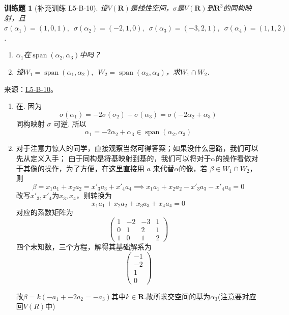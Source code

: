 \documentclass[UTF8,12pt,a4paper,fontset=fandol]{ctexart}
\newtheorem{exercise}{训练题}[section]
\begin{document}
\begin{exercise}[补充训练 L5-B-10]\label{prob:L5-B-10}
设$V(\mathbf{R})$是线性空间，$\sigma$是$V(\mathbf{R})$到$\mathbf{R}^3$的同构映射，且$\sigma(\alpha_1)=(1,0,1),\enspace\allowbreak\sigma(\alpha_2)=(-2,1,0),\enspace\allowbreak\sigma(\alpha_3)=(-3,2,1),\enspace\allowbreak\sigma(\alpha_4)=(1,1,2)$.
        \begin{enumerate}
            \item $\alpha_1$在$\operatorname{span}(\alpha_2,\alpha_3)$中吗？

            \item 设$W_1=\operatorname{span}(\alpha_1,\alpha_2),\enspace W_2=\operatorname{span}(\alpha_3,\alpha_4)$，求$W_1\cap W_2$.
        \end{enumerate}
\end{exercise}
\noindent 来源：\href{https://github.com/yhwu-is/Linear-Algebra-Left-Undone/blob/new/%E8%AE%B2%E4%B9%89/%E4%B8%93%E9%A2%98/5%20%E7%BA%BF%E6%80%A7%E6%98%A0%E5%B0%84.tex}{L5-B-10}。
\begin{solve}
\begin{enumerate}
                \item 在. 因为
                      \[ \sigma(\alpha_1) = -2 \sigma(\sigma_2) + \sigma(\alpha_3) = \sigma(-2 \alpha_2 + \alpha_3) \]
                      同构映射 $ \sigma $ 可逆. 所以
                      \[ \alpha_1 = -2 \alpha_2 + \alpha_3 \in \operatorname{span}(\alpha_2, \alpha_3) \]
                \item 对于注意力惊人的同学，直接观察当然可得答案；如果没什么思路，我们可以先从定义入手；
                由于同构是将基映射到基的，我们可以将对于$\alpha$的操作看做对于其像的操作，为了方便，在这里直接用 $a$ 来代替$\alpha$的像，若 $\beta \in W_1\cap W_2$，则
                \[ \beta = x_1 a_1+x_2 a_2=x'_3 a_3+x'_4 a_4 \implies  x_1 a_1+x_2 a_2-x'_3 a_3-x'_4 a_4 = 0 \]
                改写$x'_3,x'_4$为$x_3,x_4$，则转换为
                \[ x_1 a_1+x_2 a_2+x_3 a_3+x_4 a_4 = 0 \]
                对应的系数矩阵为
                \[ \begin{pmatrix}
                    1 & -2 & -3 & 1 \\
                    0 & 1 & 2 & 1\\
                    1 & 0 & 1 & 2
                \end{pmatrix} \]
                四个未知数，三个方程，解得其基础解系为
                \[ \begin{pmatrix}
                    -1 \\
                    -2 \\
                    1 \\
                    0
                \end{pmatrix} \]

                故$\beta = k(-a_1+-2a_2=-a_3)$其中$k\in \mathbf{R}$.故所求交空间的基为$\alpha_3$(注意要对应回$V(R)$中)
            \end{enumerate}
\end{solve}
\end{document}
